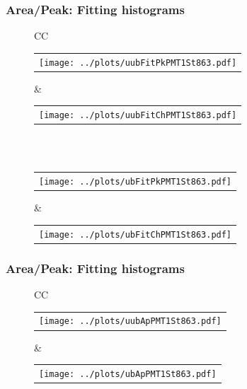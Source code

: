 \documentclass[aspectratio=169]{beamer}
\begin{document}
\begin{frame}
	\frametitle{Area/Peak: Fitting histograms}
	\begin{figure}
		\centering
		\begin{tabularx}{\textwidth}{CC}
			\\
			\begin{tabular}{l}
				\texttt{[image: ../plots/uubFitPkPMT1St863.pdf]}
			\end{tabular}
			&
			\begin{tabular}{l}
				\texttt{[image: ../plots/uubFitChPMT1St863.pdf]}
			\end{tabular}
			\\
			\\
			\begin{tabular}{l}
				\texttt{[image: ../plots/ubFitPkPMT1St863.pdf]}
			\end{tabular}
			&
			\begin{tabular}{l}
				\texttt{[image: ../plots/ubFitChPMT1St863.pdf]}
			\end{tabular}
		\end{tabularx}
	\end{figure}
\end{frame}


\begin{frame}
	\frametitle{Area/Peak: Fitting histograms}
	\begin{figure}
		\centering
		\begin{tabularx}{\textwidth}{CC}
			\begin{tabular}{l}
				\texttt{[image: ../plots/uubApPMT1St863.pdf]}
			\end{tabular}
			&
			\begin{tabular}{l}
				\texttt{[image: ../plots/ubApPMT1St863.pdf]}
			\end{tabular}
		\end{tabularx}
	\end{figure}
\end{frame}
\end{document}
